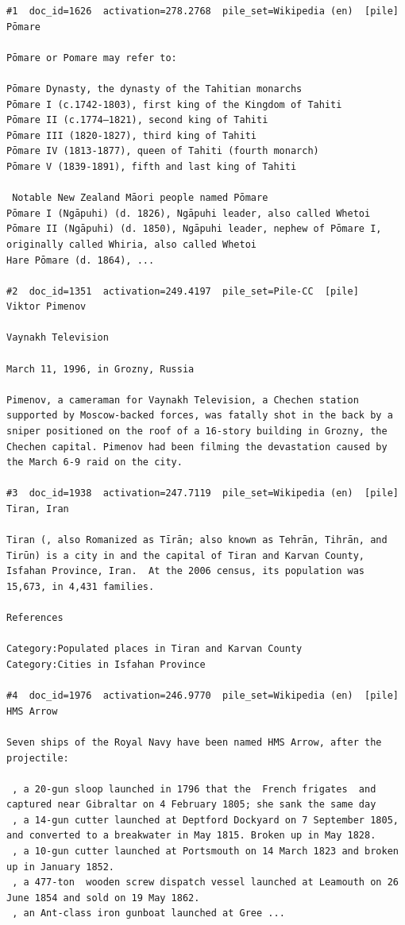 \begin{verbatim}
#1  doc_id=1626  activation=278.2768  pile_set=Wikipedia (en)  [pile]
Pōmare

Pōmare or Pomare may refer to:

Pōmare Dynasty, the dynasty of the Tahitian monarchs
Pōmare I (c.1742-1803), first king of the Kingdom of Tahiti
Pōmare II (c.1774–1821), second king of Tahiti
Pōmare III (1820-1827), third king of Tahiti
Pōmare IV (1813-1877), queen of Tahiti (fourth monarch)
Pōmare V (1839-1891), fifth and last king of Tahiti

 Notable New Zealand Māori people named Pōmare
Pōmare I (Ngāpuhi) (d. 1826), Ngāpuhi leader, also called Whetoi
Pōmare II (Ngāpuhi) (d. 1850), Ngāpuhi leader, nephew of Pōmare I, originally called Whiria, also called Whetoi
Hare Pōmare (d. 1864), ...

#2  doc_id=1351  activation=249.4197  pile_set=Pile-CC  [pile]
Viktor Pimenov

Vaynakh Television

March 11, 1996, in Grozny, Russia

Pimenov, a cameraman for Vaynakh Television, a Chechen station supported by Moscow-backed forces, was fatally shot in the back by a sniper positioned on the roof of a 16-story building in Grozny, the Chechen capital. Pimenov had been filming the devastation caused by the March 6-9 raid on the city.

#3  doc_id=1938  activation=247.7119  pile_set=Wikipedia (en)  [pile]
Tiran, Iran

Tiran (, also Romanized as Tīrān; also known as Tehrān, Tihrān, and Tirūn) is a city in and the capital of Tiran and Karvan County, Isfahan Province, Iran.  At the 2006 census, its population was 15,673, in 4,431 families.

References

Category:Populated places in Tiran and Karvan County
Category:Cities in Isfahan Province

#4  doc_id=1976  activation=246.9770  pile_set=Wikipedia (en)  [pile]
HMS Arrow

Seven ships of the Royal Navy have been named HMS Arrow, after the projectile:

 , a 20-gun sloop launched in 1796 that the  French frigates  and  captured near Gibraltar on 4 February 1805; she sank the same day
 , a 14-gun cutter launched at Deptford Dockyard on 7 September 1805, and converted to a breakwater in May 1815. Broken up in May 1828.
 , a 10-gun cutter launched at Portsmouth on 14 March 1823 and broken up in January 1852.
 , a 477-ton  wooden screw dispatch vessel launched at Leamouth on 26 June 1854 and sold on 19 May 1862.
 , an Ant-class iron gunboat launched at Gree ...


\end{verbatim}
